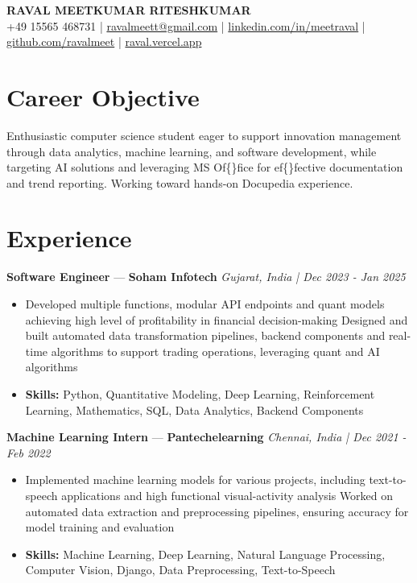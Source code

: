 \documentclass[a4paper,10pt]{article}
\begin{document}
\begin{center}
  {\Large\bfseries RAVAL MEETKUMAR RITESHKUMAR}\\[2pt]
  {\small +49 15565 468731 \;|\; \href{mailto:ravalmeett@gmail.com}{ravalmeett@gmail.com} \;|\; \href{https://www.linkedin.com/in/meetraval/}{linkedin.com/in/meetraval} \;|\; \href{https://github.com/ravalmeet}{github.com/ravalmeet} \;|\; \href{https://raval.vercel.app/}{raval.vercel.app}}
\end{center}
\vspace{-3pt}

\section*{Career Objective}
Enthusiastic computer science student eager to support innovation management through data analytics, machine learning, and software development, while targeting AI solutions and leveraging MS Of\{\}fice for ef\{\}fective documentation and trend reporting. Working toward hands-on Docupedia experience.\par

\section*{Experience}
\textbf{Software Engineer} — \textbf{Soham Infotech} \hfill \textit{Gujarat, India \;|\; Dec 2023 - Jan 2025}\par
\vspace{1pt}
\begin{itemize}
  \item Developed multiple functions, modular API endpoints and quant models achieving high level of profitability in financial decision-making Designed and built automated data transformation pipelines, backend components and real-time algorithms to support trading operations, leveraging quant and AI algorithms
  \item \textbf{Skills:} Python, Quantitative Modeling, Deep Learning, Reinforcement Learning, Mathematics, SQL, Data Analytics, Backend Components
\end{itemize}
\vspace{3pt}
\textbf{Machine Learning Intern} — \textbf{Pantechelearning} \hfill \textit{Chennai, India \;|\; Dec 2021 - Feb 2022}\par
\vspace{1pt}
\begin{itemize}
  \item Implemented machine learning models for various projects, including text-to-speech applications and high functional visual-activity analysis Worked on automated data extraction and preprocessing pipelines, ensuring accuracy for model training and evaluation
  \item \textbf{Skills:} Machine Learning, Deep Learning, Natural Language Processing, Computer Vision, Django, Data Preprocessing, Text-to-Speech
\end{itemize}
\end{document}
